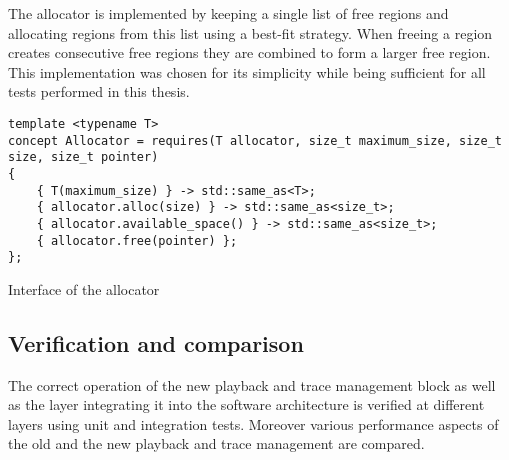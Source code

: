 The allocator is implemented by keeping a single list of free regions and allocating regions from this list using a best-fit strategy. When freeing a region creates consecutive free regions they are combined to form a larger free region. This implementation was chosen for its simplicity while being sufficient for all tests performed in this thesis.
\begin{listing}
\begin{verbatim}
template <typename T>
concept Allocator = requires(T allocator, size_t maximum_size, size_t size, size_t pointer)
{
	{ T(maximum_size) } -> std::same_as<T>;
	{ allocator.alloc(size) } -> std::same_as<size_t>;
	{ allocator.available_space() } -> std::same_as<size_t>;
	{ allocator.free(pointer) };
};
\end{verbatim}
\caption{Interface of the allocator}
\label{listing:allocator_interface}
\end{listing}

\subsection{Verification and comparison}
The correct operation of the new playback and trace management block as well as the \ayo{} layer integrating it into the \BSSTwo{} software architecture is verified at different layers using unit and integration tests. Moreover various performance aspects of the old and the new playback and trace management are compared.

